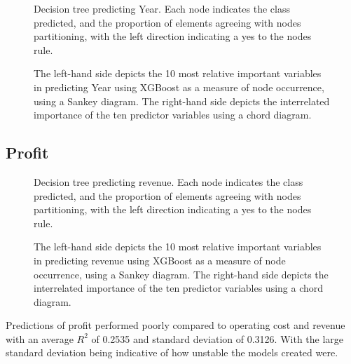 \documentclass[review,12pt,authoryear]{elsarticle}
\begin{document}
\begin{linenumbers}
 \begin{figure}[htb]
  \caption{Decision tree predicting Year. Each node indicates the class predicted, and the proportion of elements agreeing with nodes partitioning, with the left direction indicating a yes to the nodes rule.}\label{fig:year_tree}
 \end{figure}
 
\begin{figure}[htb]
  \caption{The left-hand side depicts the 10 most relative important variables in predicting Year using XGBoost as a measure of node occurrence, using a Sankey diagram. The right-hand side depicts the interrelated importance of the ten predictor variables using a chord diagram.}\label{fig:year_sankey}
 \end{figure}

 \subsection{Profit}

 \begin{figure}[htb]
  \caption{Decision tree predicting revenue. Each node indicates the class predicted, and the proportion of elements agreeing with nodes partitioning, with the left direction indicating a yes to the nodes rule.}\label{fig:revenue_tree}
 \end{figure}
 
\begin{figure}[htb]
  \caption{The left-hand side depicts the 10 most relative important variables in predicting revenue using XGBoost as a measure of node occurrence, using a Sankey diagram. The right-hand side depicts the interrelated importance of the ten predictor variables using a chord diagram.}\label{fig:profit}
 \end{figure}

Predictions of profit performed poorly compared to operating cost and revenue with an average $R^2$ of 0.2535 and standard deviation of 0.3126. With the large standard deviation being indicative of how unstable the models created were.

\end{linenumbers}
 
\end{document}
